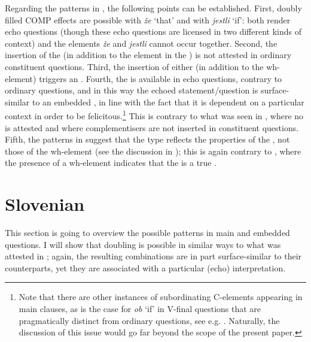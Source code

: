 \documentclass[output=paper,modfonts, hidelinks, newtxmath]{langscibook}
\begin{document}
\ea
	\z 
\z 

\noindent Regarding the  patterns in , the following points can be established. First, doubly filled COMP effects are possible with \textit{že} `that' and with \textit{jestli} `if': both render echo questions (though these echo questions are licensed in two different kinds of context) and the elements \textit{že} and \textit{jestli} cannot occur together. Second, the insertion of the  (in addition to the element in the ) is not attested in ordinary constituent questions. Third, the insertion of either  (in addition to the wh-element) triggers an . Fourth, the  is available in  echo questions, contrary to ordinary  questions, and in this way the echoed statement/question is surface-similar to an embedded , in line with the fact that it is dependent on a particular context in order to be felicitous.\footnote{Note that there are other instances of subordinating C-elements appearing in main clauses, as is the case for  \textit{ob} `if' in V-final  questions that are pragmatically distinct from ordinary questions, see e.g. \citet{zimmermann2013}. Naturally, the discussion of this issue would go far beyond the scope of the present paper.} This is contrary to what was seen in , where no  is attested and where complementisers are not inserted in  constituent questions. Fifth, the patterns in  suggest that the  type reflects the properties of the , not those of the wh-element (see the discussion in ); this is again contrary to , where the presence of a wh-element indicates that the  is a true .

\section{Slovenian}
This section is going to overview the possible patterns in  main and embedded questions. I will show that doubling is possible in similar ways to what was attested in ; again, the resulting combinations are in part surface-similar to their  counterparts, yet they are associated with a particular (echo) interpretation.
\end{document}
